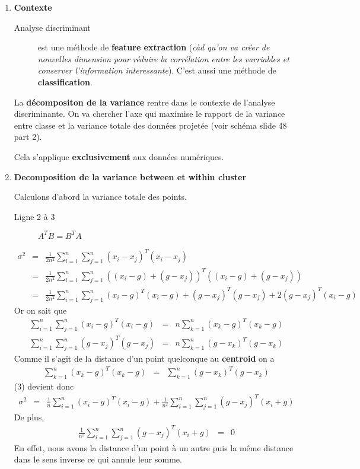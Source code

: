 \documentclass[a4paper, 11pt, onecolumn]{article}
\begin{document}
\begin{enumerate}
\item \textbf{Contexte}

  \begin{description}
    \item[Analyse discriminant] est une méthode de \textbf{feature extraction} (\textit{càd qu'on va créer de nouvelles
      dimension pour réduire la corrélation entre les varriables et conserver l'information interessante}).
      C'est aussi une méthode de \textbf{classification}.
  \end{description}

  La \textbf{décompositon de la variance} rentre dans le contexte de l'analyse discriminante.
On va chercher l'axe qui maximise le rapport de la variance entre classe et la variance totale des données projetée (voir schéma slide 48 part 2).
 

  \danger Cela s'applique \textbf{exclusivement} aux données numériques. 

\item \textbf{Decomposition de la variance between et within cluster}

\begin{framed}
Calculons d'abord la variance totale des points. 
\begin{description}
  \item[Ligne 2 à 3] $A^TB = B^TA$
\end{description}

\begin{eqnarray}
\sigma^2 &=& \frac{1}{2n^2}\sum_{i=1}^n\sum_{j=1}^n (x_i-x_j)^T(x_i-x_j)\\
&=& \frac{1}{2n^2}\sum_{i=1}^n\sum_{j=1}^n ((x_i-g)+(g-x_j))^T((x_i-g)+(g-x_j))\\
&=& \frac{1}{2n^2}\sum_{i=1}^n\sum_{j=1}^n (x_i-g)^T(x_i-g)+(g-x_j)^T(g-x_j)+2(g-x_j)^T(x_i-g)
\end{eqnarray}
Or on sait que
\begin{eqnarray}
\sum_{i=1}^n\sum_{j=1}^n (x_i-g)^T(x_i-g)&=&n\sum_{k=1}^n (x_k-g)^T(x_k-g)\\
\sum_{i=1}^n\sum_{j=1}^n (g-x_j)^T(g-x_j)&=&n\sum_{k=1}^n (g-x_k)^T(g-x_k)
\end{eqnarray}
Comme il s'agit de la distance d'un point quelconque au \textbf{centroid} on a
\begin{eqnarray}
\sum_{k=1}^n (x_k-g)^T(x_k-g)&=&\sum_{k=1}^n (g-x_k)^T(g-x_k)
\end{eqnarray}
(3) devient donc
\begin{eqnarray}
\sigma^2 &=& \frac{1}{n}\sum_{i=1}^n (x_i-g)^T(x_i-g)+ \frac{1}{n^2}\sum_{i=1}^n\sum_{j=1}^n(g-x_j)^T(x_i+g)
\end{eqnarray}
De plus, 
\begin{eqnarray}
\frac{1}{n^2}\sum_{i=1}^n\sum_{j=1}^n(g-x_j)^T(x_i+g) &=& 0
\end{eqnarray}
En effet, nous avons la distance d'un point à un autre puis la même distance dans le sens inverse ce qui annule leur somme. 


\end{framed}
\end{enumerate}
\end{document}

